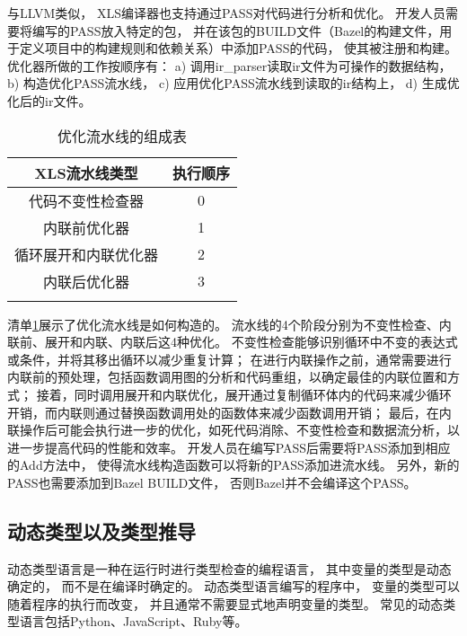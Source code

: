与LLVM类似，
XLS编译器也支持通过PASS对代码进行分析和优化。
开发人员需要将编写的PASS放入特定的包，
并在该包的BUILD文件（Bazel的构建文件，用于定义项目中的构建规则和依赖关系）中添加PASS的代码，
使其被注册和构建。
优化器所做的工作按顺序有：
a) 调用ir\_parser读取ir文件为可操作的数据结构，
b) 构造优化PASS流水线，
c) 应用优化PASS流水线到读取的ir结构上，
d) 生成优化后的ir文件。

\begin{table}[ht]
\begin{center}
\caption{优化流水线的组成表}

\begin{tabular}{ c c }
    \Xhline{3\arrayrulewidth}
    XLS流水线类型   & 执行顺序 \\
    \hline
    代码不变性检查器   & 0    \\
    内联前优化器     & 1    \\
    循环展开和内联优化器 & 2    \\
    内联后优化器     & 3   \\
    \Xhline{3\arrayrulewidth}
\end{tabular}

\label{table.1}
\end{center}
\end{table}

清单\ref{table.1}展示了优化流水线是如何构造的。
流水线的4个阶段分别为不变性检查、内联前、展开和内联、内联后这4种优化。
不变性检查能够识别循环中不变的表达式或条件，并将其移出循环以减少重复计算；
在进行内联操作之前，通常需要进行内联前的预处理，包括函数调用图的分析和代码重组，以确定最佳的内联位置和方式；
接着，同时调用展开和内联优化，展开通过复制循环体内的代码来减少循环开销，而内联则通过替换函数调用处的函数体来减少函数调用开销；
最后，在内联操作后可能会执行进一步的优化，如死代码消除、不变性检查和数据流分析，以进一步提高代码的性能和效率。
开发人员在编写PASS后需要将PASS添加到相应的Add方法中，
使得流水线构造函数可以将新的PASS添加进流水线。
另外，新的PASS也需要添加到Bazel BUILD文件，
否则Bazel并不会编译这个PASS。

\subsection{动态类型以及类型推导}

动态类型语言是一种在运行时进行类型检查的编程语言，
其中变量的类型是动态确定的，
而不是在编译时确定的。
动态类型语言编写的程序中，
变量的类型可以随着程序的执行而改变，
并且通常不需要显式地声明变量的类型。
常见的动态类型语言包括Python、JavaScript、Ruby等。

